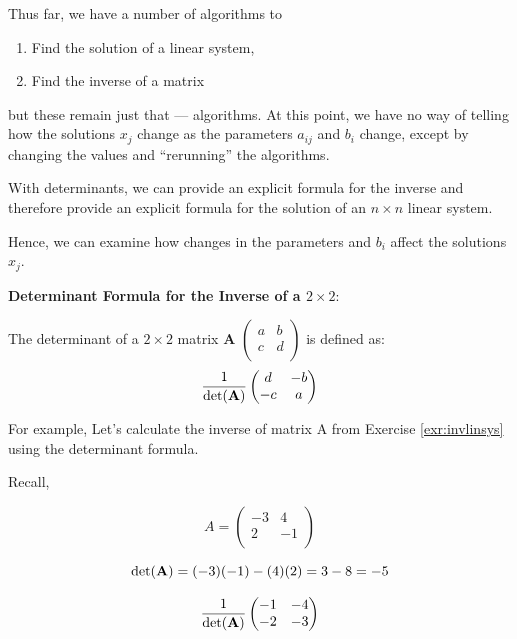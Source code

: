 \documentclass[
]{book}
\providecommand{\tightlist}{%
  \setlength{\itemsep}{0pt}\setlength{\parskip}{0pt}}
\theoremstyle{definition}
\theoremstyle{definition}
\theoremstyle{definition}
\theoremstyle{definition}
\theoremstyle{remark}
\begin{document}
Thus far, we have a number of algorithms to

\begin{enumerate}
\def\labelenumi{\arabic{enumi}.}
\tightlist
\item
  Find the solution of a linear system,
\item
  Find the inverse of a matrix
\end{enumerate}

but these remain just that --- algorithms. At this point, we have no way of telling how the solutions \(x_j\) change as the parameters \(a_{ij}\) and \(b_i\) change, except by changing the values and ``rerunning'' the algorithms.

With determinants, we can provide an explicit formula for the inverse and
therefore provide an explicit formula for the solution of an \(n\times n\) linear system.

Hence, we can examine how changes in the parameters and \(b_i\) affect the solutions \(x_j\).

\textbf{Determinant Formula for the Inverse of a \(2 \times 2\)}:

The determinant of a \(2 \times 2\) matrix \textbf{A} \(\begin{pmatrix} a & b\\ c & d\\ \end{pmatrix}\) is defined as:
\[\frac{1}{\det({\bf A})} \begin{pmatrix}
            d & -b\\
            -c & a\\
        \end{pmatrix}\]

For example, Let's calculate the inverse of matrix A from Exercise \ref{exr:invlinsys} using the determinant formula.

Recall,

\[A = \begin{pmatrix}
            -3 & 4\\
            2 & -1\\
        \end{pmatrix}\]

\[\det({\bf A}) = (-3)(-1) - (4)(2) = 3 - 8  = -5\]

\[\frac{1}{\det({\bf A})} \begin{pmatrix}
            -1 & -4\\
            -2 & -3\\
        \end{pmatrix}\]
\end{document}
